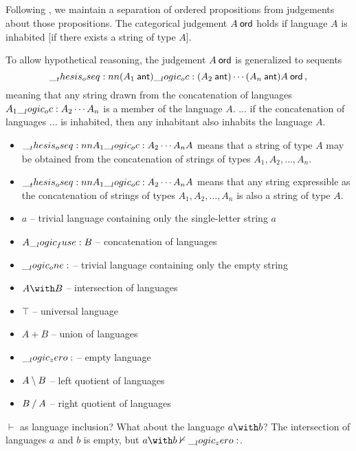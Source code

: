 \subsection{}

Following \textcite{Martin-Lof:NJPL96}, we maintain a separation of ordered propositions from judgements about those propositions.
The categorical judgement $A \ord$ holds if language $A$ is inhabited [if there exists a string of type $A$].

To allow hypothetical reasoning, the judgement $A \ord$ is generalized to sequents
\begin{equation*}
  \oseq{(A_1 \ant) \oc (A_2 \ant) \dotsb (A_n \ant) |- A \ord}
  \,,
\end{equation*}
meaning that any string drawn from the concatenation of languages $A_1 \__logic_oc: A_2 \dotsb A_n$ is a member of the language $A$.
... if the concatenation of languages ... is inhabited, then any inhabitant also inhabits the language $A$.

\begin{itemize}
\item $\oseq{A_1 \oc A_2 \dotsb A_n |- A}$ means that a string of type $A$ may be obtained from the concatenation of strings of types $A_1, A_2, \dotsc, A_n$.
\item $\oseq{A_1 \oc A_2 \dotsb A_n |- A}$ means that any string expressible as the concatenation of strings of types $A_1, A_2, \dotsc, A_n$ is also a string of type $A$.
\end{itemize}

\begin{itemize}
\item $a$ -- trivial language containing only the single-letter string $a$
\item $A \__logic_fuse: B$ -- concatenation of languages
\item $\__logic_one:$ -- trivial language containing only the empty string
\item $A \with B$ -- intersection of languages
\item $\top$ -- universal language
\item $A \plus B$ -- union of languages
\item $\__logic_zero:$ -- empty language
\item $A \mathbin { \setminus } B$ -- left quotient of languages
\item $B \mathbin { / } A$ -- right quotient of languages
\end{itemize}

$\vdash$ as language inclusion?
What about the language $a \with b$?  The intersection of languages $a$ and $b$ is empty, but $a \with b \nvdash \zero$.

